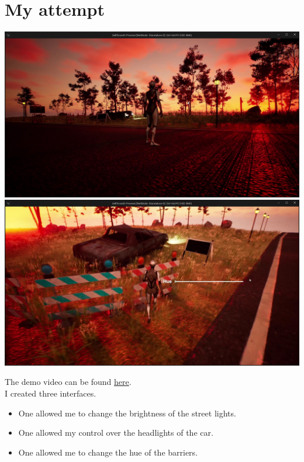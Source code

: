 \documentclass{article}
\begin{document}
\section*{My attempt}
\includegraphics[width=\textwidth]{assn2images/image.jpg}
\includegraphics[width=\textwidth]{assn2images/image1.jpg}

The demo video can be found \href{https://drive.google.com/file/d/1P66idw2XpFjDfBoq9aDA1YSETFn0wb3c/view?usp=sharing}{here}.\\

I created three interfaces.
\begin{itemize}
    \item One allowed me to change the brightness of the street lights.
    \item One allowed my control over the headlights of the car.
    \item One allowed me to change the hue of the barriers.
\end{itemize}
\end{document}
